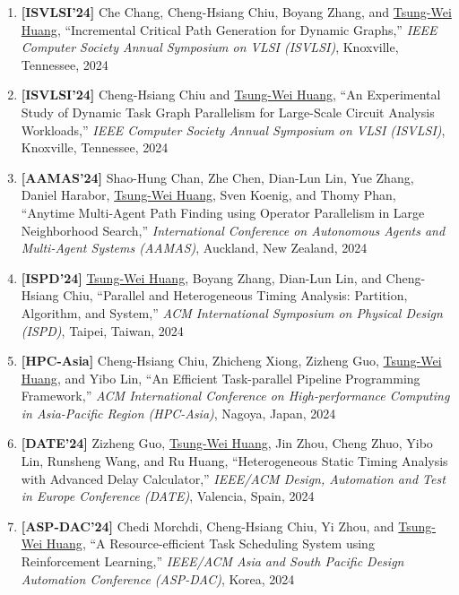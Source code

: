 \documentclass[A4,11pt]{article}
\begin{document}
\begin{enumerate}
    \item \textbf{[ISVLSI'24]} Che Chang, Cheng-Hsiang Chiu, Boyang Zhang, and \underline{Tsung-Wei Huang}, ``Incremental Critical Path Generation for Dynamic Graphs,'' \textit{IEEE Computer Society Annual Symposium on VLSI (ISVLSI)}, Knoxville, Tennessee, 2024

    \item \textbf{[ISVLSI'24]} Cheng-Hsiang Chiu and \underline{Tsung-Wei Huang}, ``An Experimental Study of Dynamic Task Graph Parallelism for Large-Scale Circuit Analysis Workloads,'' \textit{IEEE Computer Society Annual Symposium on VLSI (ISVLSI)}, Knoxville, Tennessee, 2024

    \item \textbf{[AAMAS'24]} Shao-Hung Chan, Zhe Chen, Dian-Lun Lin, Yue Zhang, Daniel Harabor, \underline{Tsung-Wei Huang}, Sven Koenig, and Thomy Phan, ``Anytime Multi-Agent Path Finding using Operator Parallelism in Large Neighborhood Search,'' \textit{International Conference on Autonomous Agents and Multi-Agent Systems (AAMAS)}, Auckland, New Zealand, 2024

    \item \textbf{[ISPD'24]} \underline{Tsung-Wei Huang}, Boyang Zhang, Dian-Lun Lin, and Cheng-Hsiang Chiu, ``Parallel and Heterogeneous Timing Analysis: Partition, Algorithm, and System,'' \textit{ACM International Symposium on Physical Design (ISPD)}, Taipei, Taiwan, 2024

    \item \textbf{[HPC-Asia]} Cheng-Hsiang Chiu, Zhicheng Xiong, Zizheng Guo, \underline{Tsung-Wei Huang}, and Yibo Lin, ``An Efficient Task-parallel Pipeline Programming Framework,'' \textit{ACM International Conference on High-performance Computing in Asia-Pacific Region (HPC-Asia)}, Nagoya, Japan, 2024

    \item \textbf{[DATE'24]} Zizheng Guo, \underline{Tsung-Wei Huang}, Jin Zhou, Cheng Zhuo, Yibo Lin, Runsheng Wang, and Ru Huang, ``Heterogeneous Static Timing Analysis with Advanced Delay Calculator,'' \textit{IEEE/ACM Design, Automation and Test in Europe Conference (DATE)}, Valencia, Spain, 2024

    \item \textbf{[ASP-DAC'24]} Chedi Morchdi, Cheng-Hsiang Chiu, Yi Zhou, and \underline{Tsung-Wei Huang}, ``A Resource-efficient Task Scheduling System using Reinforcement Learning,'' \textit{IEEE/ACM Asia and South Pacific Design Automation Conference (ASP-DAC)}, Korea, 2024
    

\end{enumerate}
\end{document}
